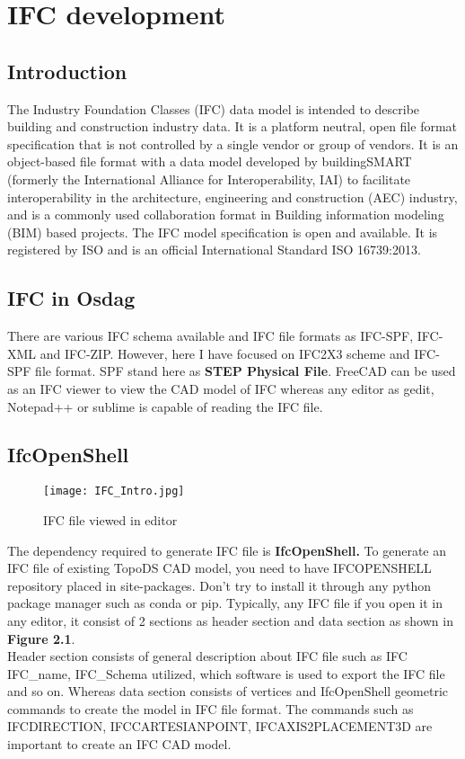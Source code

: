 \chapter{IFC development}
\section{Introduction}
The Industry Foundation Classes (IFC) data model is intended to describe building and construction industry data. It is a platform neutral, open file format specification that is not controlled by a single vendor or group of vendors. It is an object-based file format with a data model developed by buildingSMART (formerly the International Alliance for Interoperability, IAI) to facilitate interoperability in the architecture, engineering and construction (AEC) industry, and is a commonly used collaboration format in Building information modeling (BIM) based projects. The IFC model specification is open and available. It is registered by ISO and is an official International Standard ISO 16739:2013.

\section{IFC in Osdag}
There are various IFC schema available and IFC file formats as IFC-SPF, IFC-XML and IFC-ZIP.
However, here I have focused on IFC2X3 scheme and IFC-SPF file format. SPF stand here as \textbf{STEP Physical File}.
FreeCAD can be used as an IFC viewer to view the CAD model of IFC whereas any editor as gedit, Notepad++ or sublime is capable of reading the IFC file.

\section{IfcOpenShell}
\begin{figure}[h]
	\texttt{[image: IFC\_Intro.jpg]}
	\caption{IFC file viewed in editor}
\end{figure}
The dependency required to generate IFC file is \textbf{IfcOpenShell.}
To generate an IFC file of existing TopoDS CAD model, you need to have IFCOPENSHELL repository placed in site-packages. Don't try to install it through any python package manager such as conda or pip.
Typically, any IFC file if you open it in any editor, it consist of 2 sections as header section and data section as shown in \textbf{Figure 2.1}.\\
Header section consists of general description about IFC file such as IFC IFC\_name, IFC\_Schema utilized, which software is used to export the IFC file and so on.
Whereas data section consists of vertices and IfcOpenShell geometric commands to create the model in IFC file format. The commands such as IFCDIRECTION, IFCCARTESIANPOINT, IFCAXIS2PLACEMENT3D are important to create an IFC CAD model.


